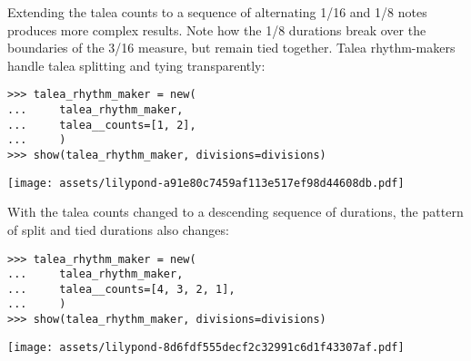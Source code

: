 \noindent Extending the talea counts to a sequence of alternating 1/16 and 1/8
notes produces more complex results. Note how the 1/8 durations break over the
boundaries of the 3/16 measure, but remain tied together. Talea rhythm-makers
handle talea splitting and tying transparently:

\begin{comment}
<abjad>
talea_rhythm_maker = new(
    talea_rhythm_maker,
    talea__counts=[1, 2],
    )
show(talea_rhythm_maker, divisions=divisions)
</abjad>
\end{comment}

\begin{abjadbookoutput}
\begin{singlespacing}
\vspace{-0.5\baselineskip}
\begin{lstlisting}
>>> talea_rhythm_maker = new(
...     talea_rhythm_maker,
...     talea__counts=[1, 2],
...     )
>>> show(talea_rhythm_maker, divisions=divisions)
\end{lstlisting}
\noindent\texttt{[image: assets/lilypond-a91e80c7459af113e517ef98d44608db.pdf]}
\end{singlespacing}
\end{abjadbookoutput}

\noindent With the talea counts changed to a descending sequence of durations,
the pattern of split and tied durations also changes:

\begin{comment}
<abjad>
talea_rhythm_maker = new(
    talea_rhythm_maker,
    talea__counts=[4, 3, 2, 1],
    )
show(talea_rhythm_maker, divisions=divisions)
</abjad>
\end{comment}

\begin{abjadbookoutput}
\begin{singlespacing}
\vspace{-0.5\baselineskip}
\begin{lstlisting}
>>> talea_rhythm_maker = new(
...     talea_rhythm_maker,
...     talea__counts=[4, 3, 2, 1],
...     )
>>> show(talea_rhythm_maker, divisions=divisions)
\end{lstlisting}
\noindent\texttt{[image: assets/lilypond-8d6fdf555decf2c32991c6d1f43307af.pdf]}
\end{singlespacing}
\end{abjadbookoutput}

